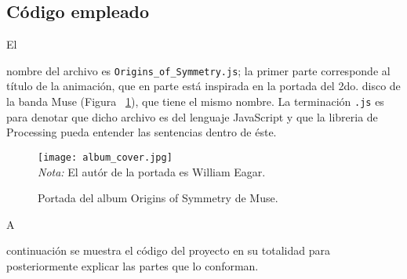 \documentclass[stu, 12pt, letterpaper, donotrepeattitle, floatsintext]{apa7}
\begin{document}
    \subsection*{Código empleado}
    El \begin{justifying}
      nombre del archivo es \verb|Origins_of_Symmetry.js|; la primer parte corresponde al título de la animación, que en parte
    está inspirada en la portada del 2do. disco de la banda Muse (Figura ~\ref{fig:muse}), %
    que tiene el mismo nombre. La terminación \verb|.js| es para denotar que dicho archivo es del lenguaje JavaScript y que 
    la libreria de Processing pueda entender las sentencias dentro de éste.\par
    \end{justifying}
    \begin{figure}[H]
      \centering
      \caption{Portada del album Origins of Symmetry de Muse.}
      \texttt{[image: album\_cover.jpg]}
      \\\emph{Nota:} El autór de la portada es William Eagar.\label{fig:muse}
    \end{figure}
    A \begin{justifying}
      continuación se muestra el código del proyecto en su totalidad para posteriormente explicar las partes que lo conforman.\par
    \end{justifying}
    \vspace{\baselineskip}
\end{document}
